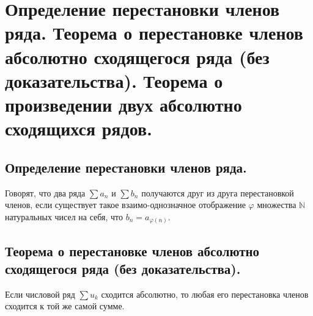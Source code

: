 \section{Определение перестановки членов ряда. Теорема о перестановке членов абсолютно сходящегося ряда (без доказательства). Теорема о произведении двух абсолютно сходящихся рядов.}

\subsection{Определение перестановки членов ряда.}
\begin{definition}
    Говорят, что два ряда $\sum a_n$ и $\sum b_n$ получаются друг из друга перестановкой членов, если существует такое взаимо-однозначное отображение $\varphi$ множества $\mathbb{N}$ натуральных чисел на себя, что $b_n = a_{\varphi(n)}$.
\end{definition}

\subsection{Теорема о перестановке членов абсолютно сходящегося ряда (без доказательства).} \label{transp_theorem}
\begin{theorem}
    Если числовой ряд $\sum u_k$ сходится абсолютно, то любая его перестановка членов сходится к той же самой сумме.
\end{theorem}

